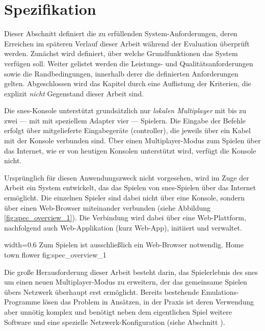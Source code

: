 \chapter{Spezifikation}\label{spezifikation}

Dieser Abschnitt definiert die zu erfüllenden System-Anforderungen,
deren Erreichen im späteren Verlauf dieser Arbeit während der Evaluation
überprüft werden. Zunächst wird definiert, über welche Grundfunktionen
das System verfügen soll. Weiter gelistet werden die Leistungs- und
Qualitätsanforderungen sowie die Randbedingungen, innerhalb derer die
definierten Anforderungen gelten. Abgeschlossen wird das Kapitel durch
eine Auflistung der Kriterien, die explizit \emph{nicht} Gegenstand
dieser Arbeit sind.

\newpage


Die \gls{snes}-Konsole unterstützt grundsätzlich nur \emph{lokalen
Multiplayer} mit bis zu zwei --- mit mit speziellem Adapter vier ---
Spielern. Die Eingabe der Befehle erfolgt über mitgelieferte
Eingabegeräte (\gls{controller}), die jeweils über ein Kabel mit der
Konsole verbunden sind. Über einen Multiplayer-Modus zum Spielen über
das Internet, wie er von heutigen Konsolen unterstützt wird, verfügt die
Konsole nicht.

Ursprünglich für diesen Anwendungszweck nicht vorgesehen, wird im Zuge
der Arbeit ein System entwickelt, das das Spielen von \gls{snes}-Spielen
über das Internet ermöglicht. Die einzelnen Spieler sind dabei nicht
über eine Konsole, sondern über einen Web-Browser miteinander verbunden
(siehe Abbildung \ref{fig:spec_overview_1}). Die Verbindung wird dabei
über eine Web-Plattform, nachfolgend auch Web-Applikation (kurz
Web-App), initiiert und verwaltet.

   {width=0.6\textwidth}
   {Zum Spielen ist ausschließlich ein Web-Browser notwendig.}
   {Home town flower}
   {fig:spec_overview_1}

Die große Herausforderung dieser Arbeit besteht darin, das Spielerlebnis
des \gls{snes} um einen neuen Multiplayer-Modus zu erweitern, der das
gemeinsame Spielen übers Netzwerk überhaupt erst ermöglicht. Bereits
bestehende Emulations-Programme lösen das Problem in Ansätzen, in der
Praxis ist deren Verwendung aber unnötig komplex und benötigt neben dem
eigentlichen Spiel weitere Software und eine spezielle
Netzwerk-Konfiguration (siehe Abschnitt \todo{}).

